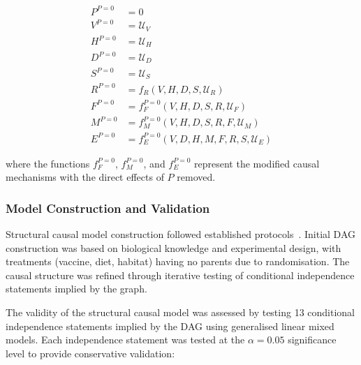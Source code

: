 \documentclass[a4paper, hidelinks, 11pt]{article}
\begin{document}
\begin{appendices}
	\begin{align}
		P^{P=0} & = 0                                                                          \\
		V^{P=0} & = \mathcal{U}_V                                                              \\
		H^{P=0} & = \mathcal{U}_H                                                              \\
		D^{P=0} & = \mathcal{U}_D                                                              \\
		S^{P=0} & = \mathcal{U}_S                                                              \\
		R^{P=0} & = f_R(V, H, D, S, \mathcal{U}_R)                                             \\
		F^{P=0} & = f_F^{P=0}(V, H, D, S, R, \mathcal{U}_F)                                    \\
		M^{P=0} & = f_M^{P=0}(V, H, D, S, R, F, \mathcal{U}_M)                                 \\
		E^{P=0} & = f_E^{P=0}(V, D, H, M, F, R, S, \mathcal{U}_E) \label{eq:SCMcounterfactual}
	\end{align}

	where the functions $f_F^{P=0}$, $f_M^{P=0}$, and $f_E^{P=0}$ represent the modified causal mechanisms with the direct effects of $P$ removed.

	\subsubsection{Model Construction and Validation}\label{supdata:SCMconstruction}

	Structural causal model construction followed established protocols~\cite{Pearl2009b}. Initial DAG construction was based on biological knowledge and experimental design, with treatments (vaccine, diet, habitat) having no parents due to randomisation. The causal structure was refined through iterative testing of conditional independence statements implied by the graph.

	The validity of the structural causal model was assessed by testing 13 conditional independence statements implied by the DAG using generalised linear mixed models. Each independence statement was tested at the $\alpha = 0.05$ significance level to provide conservative validation:


\end{appendices}
\end{document}

